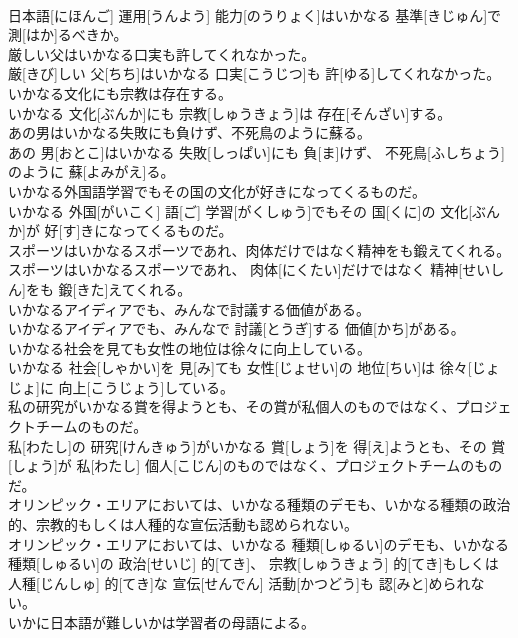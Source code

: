 \documentclass[8pt]{extreport}
\begin{document}
\begin{CJK}{UTF8}{min}
\\	日本語[にほんご] 運用[うんよう] 能力[のうりょく]はいかなる 基準[きじゅん]で 測[はか]るべきか。
\\	厳しい父はいかなる口実も許してくれなかった。	
\\	厳[きび]しい 父[ちち]はいかなる 口実[こうじつ]も 許[ゆる]してくれなかった。
\\	いかなる文化にも宗教は存在する。	
\\	いかなる 文化[ぶんか]にも 宗教[しゅうきょう]は 存在[そんざい]する。
\\	あの男はいかなる失敗にも負けず、不死鳥のように蘇る。	
\\	あの 男[おとこ]はいかなる 失敗[しっぱい]にも 負[ま]けず、 不死鳥[ふしちょう]のように 蘇[よみがえ]る。
\\	いかなる外国語学習でもその国の文化が好きになってくるものだ。	
\\	いかなる 外国[がいこく] 語[ご] 学習[がくしゅう]でもその 国[くに]の 文化[ぶんか]が 好[す]きになってくるものだ。
\\	スポーツはいかなるスポーツであれ、肉体だけではなく精神をも鍛えてくれる。	
\\	スポーツはいかなるスポーツであれ、 肉体[にくたい]だけではなく 精神[せいしん]をも 鍛[きた]えてくれる。
\\	いかなるアイディアでも、みんなで討議する価値がある。	
\\	いかなるアイディアでも、みんなで 討議[とうぎ]する 価値[かち]がある。
\\	いかなる社会を見ても女性の地位は徐々に向上している。	
\\	いかなる 社会[しゃかい]を 見[み]ても 女性[じょせい]の 地位[ちい]は 徐々[じょじょ]に 向上[こうじょう]している。
\\	私の研究がいかなる賞を得ようとも、その賞が私個人のものではなく、プロジェクトチームのものだ。	
\\	私[わたし]の 研究[けんきゅう]がいかなる 賞[しょう]を 得[え]ようとも、その 賞[しょう]が 私[わたし] 個人[こじん]のものではなく、プロジェクトチームのものだ。
\\	オリンピック・エリアにおいては、いかなる種類のデモも、いかなる種類の政治的、宗教的もしくは人種的な宣伝活動も認められない。	
\\	オリンピック・エリアにおいては、いかなる 種類[しゅるい]のデモも、いかなる 種類[しゅるい]の 政治[せいじ] 的[てき]、 宗教[しゅうきょう] 的[てき]もしくは 人種[じんしゅ] 的[てき]な 宣伝[せんでん] 活動[かつどう]も 認[みと]められない。
\\	いかに日本語が難しいかは学習者の母語による。	

\end{CJK}
\end{document}
